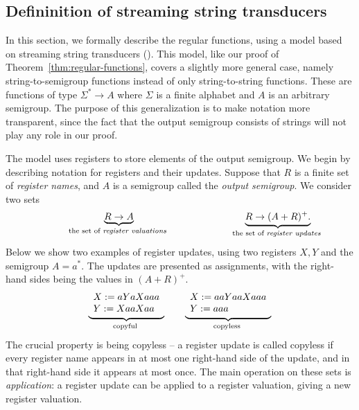\subsection{Defininition of streaming string transducers}
\label{sec:sst-definition}
In this section, we formally describe the regular functions, using a model based on streaming string transducers (\sst).  This model, like our proof of Theorem~\ref{thm:regular-functions}, covers a slightly more general case, namely string-to-semigroup functions instead of only string-to-string functions. These are functions of type $\Sigma^* \to A$ where $\Sigma$ is a finite alphabet and $A$ is an arbitrary semigroup.  The purpose of this generalization is to make notation more transparent, since the fact that the output semigroup consists of strings will not play any role in our proof.

The model uses registers to store elements of the output semigroup. We begin by describing notation for registers and their updates. Suppose that $R$ is a finite set of \emph{register names}, and $A$ is a semigroup called the \emph{output semigroup}. We consider two sets 
\begin{align*}
\hspace{2cm}
    \myunderbrace{R \to A}{the set of \emph{register valuations}} 
    \hspace{4cm}
    \myunderbrace{R \to (A+R)^+.}{the set of \emph{register updates}}
\end{align*}
Below we show two examples of register updates, using two registers $X,Y$ and the semigroup $A = a^*$.  The updates are presented as assignments, with the right-hand sides being the values in $(A+R)^+$.
\begin{align*}
    \myunderbrace{
    \begin{array}{l}
        X:= aYaXaaa\\
    Y:= XaaXaa
    \end{array}
    }{copyful}
    \qquad 
    \myunderbrace{
    \begin{array}{l}
        X:= aaYaaXaaa\\
    Y:= aaa
    \end{array}
    }{copyless}
    \end{align*}
The crucial property is being copyless -- a register update is called copyless if every register name appears in at most one right-hand side of the update, and in that right-hand side it appears at most once. 
The main operation on these sets is \emph{application}: a register update can be applied to a register valuation, giving a new register valuation. 


